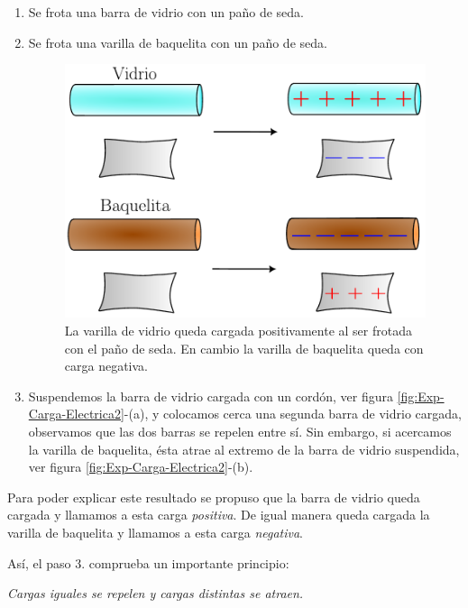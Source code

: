 \begin{enumerate}
\item Se frota una barra de vidrio con un paño de seda. 

\item Se frota una varilla de baquelita con un paño de seda.

\begin{figure}[H]
    \centering
    \includegraphics[scale = 0.5]{Figuras/Exp-Carga-Electrico.pdf}
    \caption{La varilla de vidrio queda cargada positivamente al ser frotada con el paño de seda. En cambio la varilla de baquelita queda con carga negativa.}
    \label{fig:Exp-Carga-Electrica1}
\end{figure}

\item Suspendemos la barra de vidrio cargada con un cordón, ver figura \ref{fig:Exp-Carga-Electrica2}-(a), y colocamos cerca una segunda barra de vidrio cargada, observamos que las dos barras se repelen entre sí. Sin embargo, si acercamos la varilla de baquelita, ésta atrae al extremo de la barra de vidrio suspendida, ver figura \ref{fig:Exp-Carga-Electrica2}-(b).

\end{enumerate}

Para poder explicar este resultado se propuso  que la barra de vidrio queda cargada y llamamos a esta carga \textit{positiva}. De igual manera queda cargada la varilla de baquelita y llamamos a esta carga \textit{negativa}.

Así, el paso 3. comprueba un importante principio:

\begin{shaded}
\begin{center}
\textit{Cargas iguales se repelen y cargas distintas se atraen.}
\end{center}
\end{shaded}

